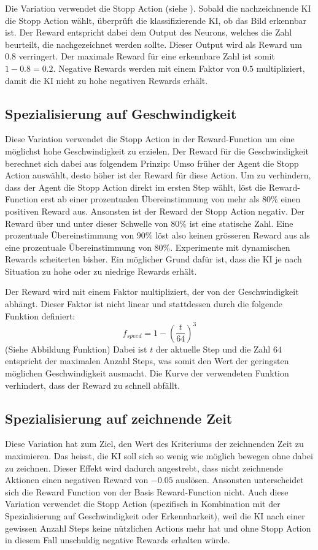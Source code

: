 Die Variation verwendet die Stopp Action (siehe
). Sobald die nachzeichnende KI die Stopp
Action wählt, überprüft die klassifizierende KI, ob das Bild erkennbar ist. Der
Reward entspricht dabei dem Output des Neurons, welches die Zahl beurteilt, die
nachgezeichnet werden sollte. Dieser Output wird als Reward um $0.8$ verringert.
Der maximale Reward für eine erkennbare Zahl ist somit $1 - 0.8 = 0.2$. Negative
Rewards werden mit einem Faktor von $0.5$ multipliziert, damit die KI nicht zu
hohe negativen Rewards erhält.

\subsection{Spezialisierung auf Geschwindigkeit}\label{sub:m_var_speed} Diese
Variation verwendet die Stopp Action in der Reward-Function um eine möglichst
hohe Geschwindigkeit zu erzielen. Der Reward für die Geschwindigkeit berechnet
sich dabei aus folgendem Prinzip: Umso früher der Agent die Stopp Action
auswählt, desto höher ist der Reward für diese Action. Um zu verhindern, dass
der Agent die Stopp Action direkt im ersten Step wählt, löst die Reward-Function
erst ab einer prozentualen Übereinstimmung von mehr als $80\%$ einen positiven
Reward aus. Ansonsten ist der Reward der Stopp Action negativ. Der Reward über
und unter dieser Schwelle von $80\%$ ist eine statische Zahl. Eine prozentuale
Übereinstimmung von $90\%$ löst also keinen grösseren Reward aus als eine
prozentuale Übereinstimmung von $80\%$. Experimente mit dynamischen Rewards
scheiterten bisher. Ein möglicher Grund dafür ist, dass die KI je nach Situation
zu hohe oder zu niedrige Rewards erhält.

Der Reward wird mit einem Faktor multipliziert, der von der Geschwindigkeit
abhängt. Dieser Faktor ist nicht linear und stattdessen durch die folgende Funktion definiert:
$$ f_{speed} = 1 - (\frac{t}{64})^{3}$$ (Siehe Abbildung Funktion) Dabei ist
$t$ der aktuelle Step und die Zahl $64$ entspricht der maximalen Anzahl Steps,
was somit den Wert der geringsten möglichen Geschwindigkeit ausmacht. Die Kurve
der verwendeten Funktion verhindert, dass der Reward zu schnell abfällt.

\subsection{Spezialisierung auf zeichnende Zeit}\label{sub:m_var_penlift}
Diese Variation hat zum Ziel, den Wert des Kriteriums der zeichnenden Zeit zu
maximieren. Das heisst, die KI soll sich so wenig wie möglich bewegen ohne dabei
zu zeichnen. Dieser Effekt wird dadurch angestrebt, dass nicht zeichnende
Aktionen einen negativen Reward von $-0.05$ auslösen. Ansonsten unterscheidet
sich die Reward Function von der Basis Reward-Function nicht. Auch diese
Variation verwendet die Stopp Action (spezifisch in Kombination mit der
Spezialisierung auf Geschwindigkeit oder Erkennbarkeit), weil die KI nach einer
gewissen Anzahl Steps keine nützlichen Actions mehr hat und ohne Stopp Action in
diesem Fall unschuldig negative Rewards erhalten würde.

